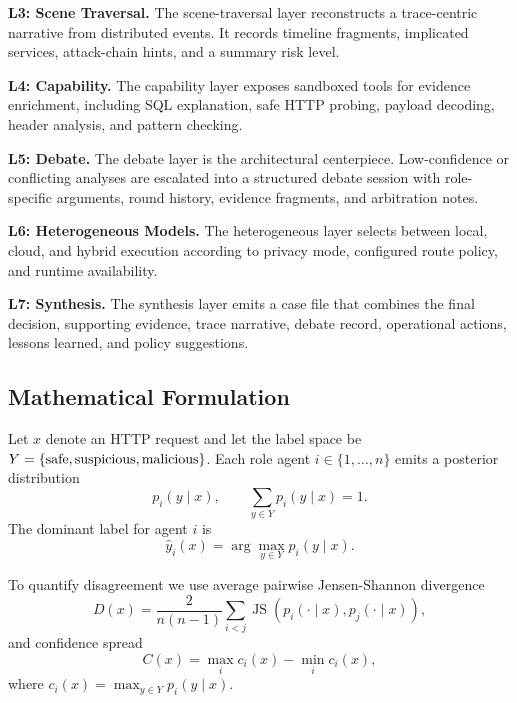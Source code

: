 \documentclass{ieeeaccess}
\begin{document}
\textbf{L3: Scene Traversal.} The scene-traversal layer reconstructs a trace-centric narrative from distributed events. It records timeline fragments, implicated services, attack-chain hints, and a summary risk level.

\textbf{L4: Capability.} The capability layer exposes sandboxed tools for evidence enrichment, including SQL explanation, safe HTTP probing, payload decoding, header analysis, and pattern checking.

\textbf{L5: Debate.} The debate layer is the architectural centerpiece. Low-confidence or conflicting analyses are escalated into a structured debate session with role-specific arguments, round history, evidence fragments, and arbitration notes.

\textbf{L6: Heterogeneous Models.} The heterogeneous layer selects between local, cloud, and hybrid execution according to privacy mode, configured route policy, and runtime availability.

\textbf{L7: Synthesis.} The synthesis layer emits a case file that combines the final decision, supporting evidence, trace narrative, debate record, operational actions, lessons learned, and policy suggestions.

\subsection{Mathematical Formulation}
Let $x$ denote an HTTP request and let the label space be $Y=\{\textnormal{safe}, \textnormal{suspicious}, \textnormal{malicious}\}$. Each role agent $i \in \{1,\dots,n\}$ emits a posterior distribution
\begin{equation}
p_i(y \mid x), \qquad \sum_{y \in Y} p_i(y \mid x)=1.
\end{equation}
The dominant label for agent $i$ is
\begin{equation}
\hat{y}_i(x)=\arg\max_{y \in Y} p_i(y \mid x).
\end{equation}

To quantify disagreement we use average pairwise Jensen-Shannon divergence
\begin{equation}
D(x)=\frac{2}{n(n-1)} \sum_{i<j} \operatorname{JS}\!\left(p_i(\cdot \mid x), p_j(\cdot \mid x)\right),
\end{equation}
and confidence spread
\begin{equation}
C(x)=\max_i c_i(x)-\min_i c_i(x),
\end{equation}
where $c_i(x)=\max_{y \in Y} p_i(y \mid x)$.
\end{document}
